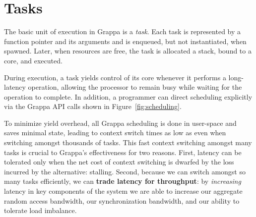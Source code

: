 \section{Tasks}

The basic unit of execution in Grappa is a {\em task}. Each task is
represented by a function pointer and its arguments and is enqueued,
but not instantiated, when spawned.  Later, when resources are free,
the task is allocated a stack, bound to a core, and executed.

During execution, a task yields control of its core whenever it performs
a long-latency operation, allowing the processor to remain busy while
waiting for the operation to complete.  In addition,  a programmer can
direct scheduling explicitly via the Grappa API calls shown
in Figure~\ref{fig:scheduling}.

To minimize yield overhead, all Grappa scheduling is done in
user-space and saves minimal state, leading to context switch times as
low as  even when switching amongst thousands of tasks.
This fast context switching amongst many tasks is crucial to Grappa's
effectiveness for two reasons.  First, latency can be tolerated only
when the net cost of context switching is dwarfed by the loss incurred
by the alternative: stalling.  Second, because we can switch amongst
so many tasks efficiently, we can \textbf{trade latency for throughput}:
by {\em increasing} latency in key components of the
system we are able to increase our aggregate random access bandwidth,
our synchronization bandwidth, and our ability to tolerate load
imbalance.


